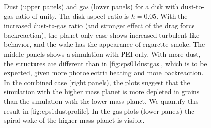 \documentclass[onecolumn]{report}
\begin{document}
\begin{figure}
  \begin{center}
  \end{center}
  \caption{Dust (upper panels) and gas (lower panels) for a disk with
    dust-to-gas ratio of unity. The disk aspect ratio is
    $h=0.05$. With the increased dust-to-gas ratio (and stronger
    effect of the drag force backreaction), the planet-only case shows increased
    turbulent-like behavior, and the wake has the appearance of
    cigarette smoke. The middle panels shows a simulation with PEI
    only. With more dust, the structures are different than in
    \ref{fig:eps01dustgas}, which is to be expected, given
    more photoelectric heating and more backreaction.
    In the combined case (right panels), the plots suggest that
    the simulation with the higher mass planet is more depleted in
    grains than the simulation with the lower mass planet. We quantify
    this result in \ref{fig:eps1dustprofile}. In the gas
    plots (lower panels) the spiral wake of the higher mass planet is
    visible.}
  \label{fig:eps1dustgas}
  \end{figure}
\end{document}
